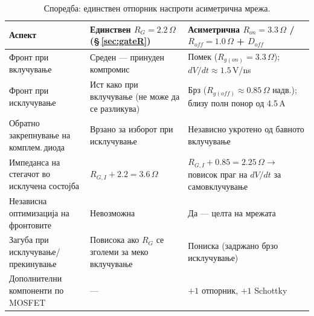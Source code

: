 \documentclass[11pt,a4paper]{article}
\newcommand{\eng}[1]{\textenglish{#1}}
\begin{document}
\begin{table}[h]
\centering
\caption{Споредба: единствен отпорник наспроти асиметрична мрежа.}
\begin{tabularx}{\textwidth}{@{}L L L@{}}
\toprule
\textbf{Аспект} & \textbf{Единствен $R_{G}=2.2\,\Omega$ (\S\,\ref{sec:gateR})} & \textbf{Асиметрична $R_{on}=3.3\,\Omega$ / $R_{off}=1.0\,\Omega$ + $D_{off}$} \\
\midrule
Фронт при вклучување & Среден --- принуден компромис & Помек ($R_{g(on)}=3.3\,\Omega$); $dV/dt\approx 1.5$\,V/ns \cite{ref1,ref3} \\
Фронт при исклучување & Ист како при вклучување (не може да се разликува) & Брз ($R_{g(off)}\approx 0.85\,\Omega$ надв.); близу полн понор од 4.5\,A \cite{ref3} \\
Обратно закрепнување на комплем.\,диода & Врзано за изборот при исклучување & Независно укротено од бавното вклучување \cite{ref12,ref13} \\
Импеданса на стегачот во исклучена состојба & $R_{G,I}+2.2=3.6\,\Omega$ & $R_{G,I}+0.85=2.25\,\Omega \rightarrow$ повисок праг на $dV/dt$ за самовклучување \cite{ref13,ref14} \\
Независна оптимизација на фронтовите & Невозможна & Да --- целта на мрежата \cite{ref12} \\
Загуба при исклучување/прекинување & Повисока ако $R_G$ се зголеми за меко вклучување & Пониска (задржано брзо исклучување) \\
Дополнителни компоненти по MOSFET & --- & $+1$ отпорник, $+1$ \eng{Schottky} \\
\bottomrule
\end{tabularx}
\end{table}
\end{document}
